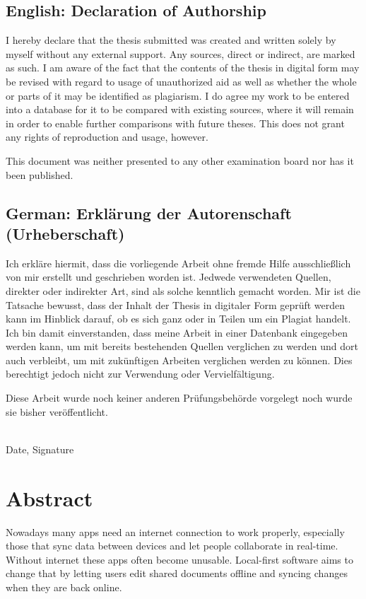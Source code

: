 \documentclass[a4paper, 11pt, oneside]{article}
\theoremstyle{definition}
\begin{document}
\subsection*{English: Declaration of Authorship}

I hereby declare that the thesis submitted was created and written solely by
myself without any external support. Any sources, direct or indirect, are marked
as such. I am aware of the fact that the contents of the thesis in digital
form may be revised with regard to usage of unauthorized aid as well as
whether the whole or parts of it may be identified as plagiarism. I do agree my
work to be entered into a database for it to be compared with existing sources,
where it will remain in order to enable further comparisons with future theses.
This does not grant any rights of reproduction and usage, however.

This document was neither presented to any other examination board nor has it
been published.

\subsection*{German: Erklärung der Autorenschaft (Urheberschaft)}

Ich erkläre hiermit, dass die vorliegende Arbeit ohne fremde Hilfe
ausschließlich von mir erstellt und geschrieben worden ist. Jedwede verwendeten
Quellen, direkter oder indirekter Art, sind als solche kenntlich gemacht worden.
Mir ist die Tatsache bewusst, dass der Inhalt der Thesis in digitaler Form geprüft
werden kann im Hinblick darauf, ob es sich ganz oder in Teilen um ein Plagiat
handelt. Ich bin damit einverstanden, dass meine Arbeit in einer Datenbank
eingegeben werden kann, um mit bereits bestehenden Quellen verglichen zu werden
und dort auch verbleibt, um mit zukünftigen Arbeiten verglichen werden zu
können. Dies berechtigt jedoch nicht zur Verwendung oder Vervielfältigung.

Diese Arbeit wurde noch keiner anderen Prüfungsbehörde vorgelegt noch wurde sie
bisher veröffentlicht.

\vspace{20mm}

\dotfill\\ Date, Signature

\newpage

\section{Abstract}
Nowadays many apps need an internet connection to work properly, especially those that sync data between devices and let people collaborate in real-time. Without internet these apps often become unusable. Local-first software aims to change that by letting users edit shared documents offline and syncing changes when they are back online.
\end{document}
